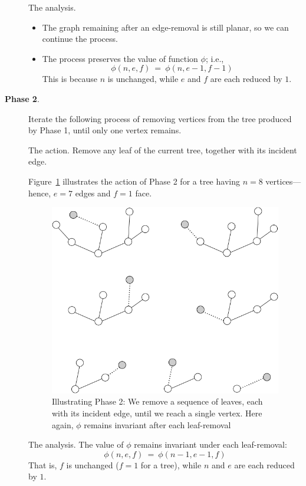\begin{description}
{\sf The analysis}.
\begin{itemize}
\item
The graph remaining after an edge-removal is still planar, so we can continue the process.
\medskip\item
The process preserves the value of function $\phi$; i.e.,
\[ \phi(n,e,f) \ = \ \phi(n,e-1,f-1) \]
This is because $n$ is unchanged, while $e$ and $f$ are each reduced by $1$.
\end{itemize}

\medskip\item[{\bf Phase 2}.]
Iterate the following process of removing vertices from the tree produced by Phase 1, until only one vertex remains.

\medskip

{\sf The action}.
Remove any leaf of the current tree, together with its incident edge.

\smallskip

Figure~\ref{fig:planarStep2} illustrates the action of Phase  2 for a tree having $n=8$ vertices---hence, $e=7$ edges and $f=1$ face.
\begin{figure}[hbt]
\begin{center}
   \includegraphics[scale=0.35]{FiguresGraph/planarStep2}
 \caption{Illustrating Phase 2: We remove a sequence of leaves, each with its incident edge, until we reach a single vertex.  Here again, $\phi$ remains invariant after each leaf-removal}
  \label{fig:planarStep2}
\end{center}
\end{figure}

\medskip

{\sf The analysis}.
The value of $\phi$ remains invariant under each leaf-removal:
\[ \phi(n,e,f) \ = \ \phi(n-1,e-1,f) \]
That is, $f$ is unchanged ($f = 1$ for a tree), while $n$ and $e$ are each reduced by $1$.
\end{description}

